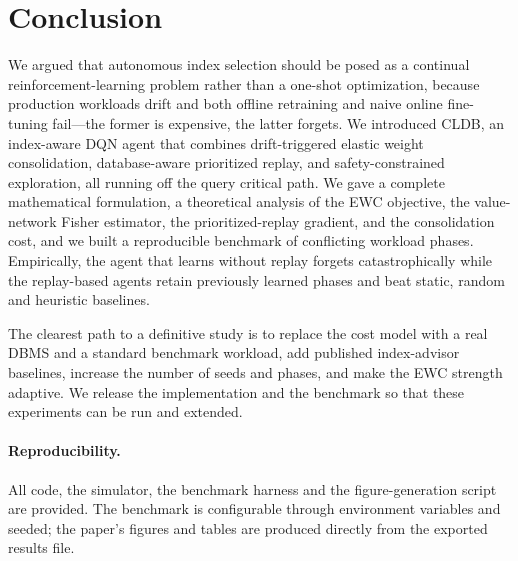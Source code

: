 \section{Conclusion}
\label{sec:conclusion}

We argued that autonomous index selection should be posed as a continual
reinforcement-learning problem rather than a one-shot optimization, because
production workloads drift and both offline retraining and naive online
fine-tuning fail---the former is expensive, the latter forgets. We introduced
CLDB, an index-aware DQN agent that combines drift-triggered elastic weight
consolidation, database-aware prioritized replay, and safety-constrained
exploration, all running off the query critical path. We gave a complete
mathematical formulation, a theoretical analysis of the EWC objective, the
value-network Fisher estimator, the prioritized-replay gradient, and the
consolidation cost, and we built a reproducible benchmark of conflicting workload
phases. Empirically, the agent that learns without replay forgets catastrophically
while the replay-based agents retain previously learned phases and beat static,
random and heuristic baselines.

The clearest path to a definitive study is to replace the cost model with a real
DBMS and a standard benchmark workload, add published index-advisor baselines,
increase the number of seeds and phases, and make the EWC strength adaptive. We
release the implementation and the benchmark so that these experiments can be
run and extended.

\paragraph{Reproducibility.}
All code, the simulator, the benchmark harness and the figure-generation script
are provided. The benchmark is configurable through environment variables and
seeded; the paper's figures and tables are produced directly from the exported
results file.
